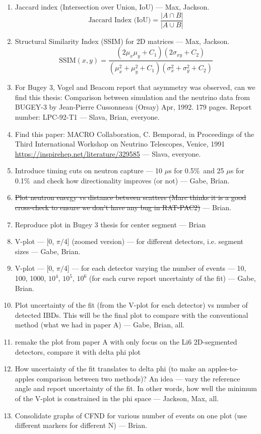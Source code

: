 \begin{enumerate}
    \item Jaccard index (Intersection over Union, IoU)  --- Max, Jackson.
\[
\text{Jaccard Index (IoU)} = \frac{|A \cap B|}{|A \cup B|}
\]
    \item
    Structural Similarity Index (SSIM) for 2D matrices --- Max, Jackson.
    \[
\text{SSIM}(x, y) = \frac{(2\mu_x \mu_y + C_1)(2\sigma_{xy} + C_2)}{(\mu_x^2 + \mu_y^2 + C_1)(\sigma_x^2 + \sigma_y^2 + C_2)}
\]
        \item For Bugey 3, Vogel and Beacom report that asymmetry was observed, can we find this thesis: Comparison between simulation and the neutrino data from BUGEY-3 by    Jean-Pierre Cussonneau (Orsay) Apr, 1992. 179 pages. Report  number: LPC-92-T1 --- Slava, Brian, everyone.
        \item Find this paper: MACRO Collaboration, C. Bemporad, in Proceedings of the
Third International Workshop on Neutrino Telescopes, Venice,
1991 \href{https://inspirehep.net/literature/329585}{https://inspirehep.net/literature/329585} --- Slava, everyone.

\item Introduce timing cuts on neutron capture ---  10 $\mu$s for 0.5\%\ and 25 $\mu$s for 0.1\%\ and check how directionality improves (or not) --- Gabe, Brian.
\item \sout{Plot neutron energy vs distance between scatters (Marc thinks it is a good cross-check to ensure we don't have any bug in RAT-PAC2)} --- Brian.
\item Reproduce plot in Bugey 3 thesis for center segment --- Brian
\item V-plot --- [0, $\pi/4$] (zoomed version) --- for different detectors, i.e. segment sizes --- Gabe, Brian.
\item V-plot --- [0, $\pi/4$] --- for each detector varying the number of events --- 10, 100, 1000, $10^4$, $10^5$, $10^6$ (for each curve report uncertainty of the fit) --- Gabe, Brian.
\item Plot uncertainty of the fit (from the V-plot for each detector) vs number of detected IBDs. This will be the final plot to compare with the conventional method (what we had in paper A) --- Gabe, Brian, all.
\item remake the plot from paper A with only focus on the Li6 2D-segmented detectors, compare it with delta phi plot
\item How uncertainty of the fit translates to delta phi (to make an apples-to-apples comparison between two methods)? An idea --- vary the reference angle and report uncertainty of the fit. In other words, how well the minimum of the V-plot is constrained in the phi space --- Jackson, Max, all.

\item Consolidate graphs of CFND for various number of events on one plot (use different markers for  different N) --- Brian.
\end{enumerate}

